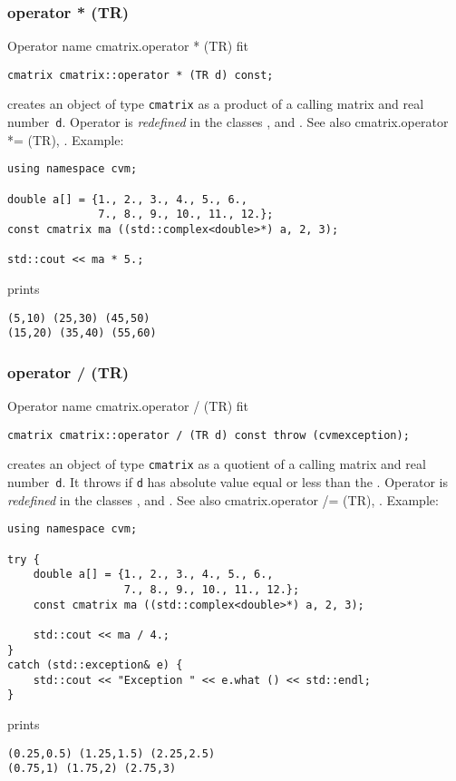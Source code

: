 \subsubsection{operator * (TR)}
Operator%
\pdfdest name {cmatrix.operator * (TR)} fit
\begin{verbatim}
cmatrix cmatrix::operator * (TR d) const;
\end{verbatim}
creates an object of type \verb"cmatrix" as a product of
a calling  matrix and  real number~\verb"d".
Operator is \emph{redefined} in the classes
,  
and .
See also 
{cmatrix.operator *= (TR)},
.
Example:
\begin{Verbatim}
using namespace cvm;

double a[] = {1., 2., 3., 4., 5., 6.,
              7., 8., 9., 10., 11., 12.};
const cmatrix ma ((std::complex<double>*) a, 2, 3);

std::cout << ma * 5.;
\end{Verbatim}
prints
\begin{Verbatim}
(5,10) (25,30) (45,50)
(15,20) (35,40) (55,60)
\end{Verbatim}
\newpage



\subsubsection{operator / (TR)}
Operator%
\pdfdest name {cmatrix.operator / (TR)} fit
\begin{verbatim}
cmatrix cmatrix::operator / (TR d) const throw (cvmexception);
\end{verbatim}
creates an object of type \verb"cmatrix" as a quotient of
a calling  matrix and  real number~\verb"d". It throws
if \verb"d" has  absolute value equal or less than the
.
Operator is \emph{redefined} in the classes
,  
and .
See also 
{cmatrix.operator /= (TR)},
.
Example:
\begin{Verbatim}
using namespace cvm;

try {
    double a[] = {1., 2., 3., 4., 5., 6.,
                  7., 8., 9., 10., 11., 12.};
    const cmatrix ma ((std::complex<double>*) a, 2, 3);

    std::cout << ma / 4.;
}
catch (std::exception& e) {
    std::cout << "Exception " << e.what () << std::endl;
}
\end{Verbatim}
prints
\begin{Verbatim}
(0.25,0.5) (1.25,1.5) (2.25,2.5)
(0.75,1) (1.75,2) (2.75,3)
\end{Verbatim}
\newpage



